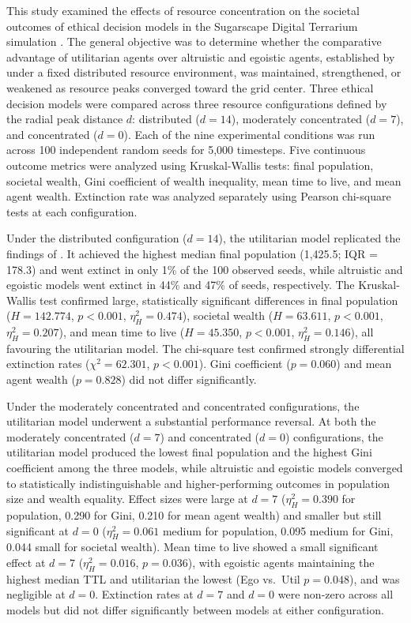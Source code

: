 \documentclass{icsthesis}
\begin{document}
\begin{mainmatter}
This study examined the effects of resource concentration on the societal outcomes of ethical decision models in the Sugarscape Digital Terrarium simulation \citep{KremerHerman2024}. The general objective was to determine whether the comparative advantage of utilitarian agents over altruistic and egoistic agents, established by \citet{KremerHerman2024} under a fixed distributed resource environment, was maintained, strengthened, or weakened as resource peaks converged toward the grid center. Three ethical decision models were compared across three resource configurations defined by the radial peak distance $d$: distributed ($d = 14$), moderately concentrated ($d = 7$), and concentrated ($d = 0$). Each of the nine experimental conditions was run across 100 independent random seeds for 5,000 timesteps. Five continuous outcome metrics were analyzed using Kruskal-Wallis tests: final population, societal wealth, Gini coefficient of wealth inequality, mean time to live, and mean agent wealth. Extinction rate was analyzed separately using Pearson chi-square tests at each configuration.

Under the distributed configuration ($d = 14$), the utilitarian model replicated the findings of \citet{KremerHerman2024}. It achieved the highest median final population (1,425.5; IQR = 178.3) and went extinct in only 1\% of the 100 observed seeds, while altruistic and egoistic models went extinct in 44\% and 47\% of seeds, respectively. The Kruskal-Wallis test confirmed large, statistically significant differences in final population ($H = 142.774$, $p < 0.001$, $\eta^2_H = 0.474$), societal wealth ($H = 63.611$, $p < 0.001$, $\eta^2_H = 0.207$), and mean time to live ($H = 45.350$, $p < 0.001$, $\eta^2_H = 0.146$), all favouring the utilitarian model. The chi-square test confirmed strongly differential extinction rates ($\chi^2 = 62.301$, $p < 0.001$). Gini coefficient ($p = 0.060$) and mean agent wealth ($p = 0.828$) did not differ significantly.

Under the moderately concentrated and concentrated configurations, the utilitarian model underwent a substantial performance reversal. At both the moderately concentrated ($d = 7$) and concentrated ($d = 0$) configurations, the utilitarian model produced the lowest final population and the highest Gini coefficient among the three models, while altruistic and egoistic models converged to statistically indistinguishable and higher-performing outcomes in population size and wealth equality. Effect sizes were large at $d = 7$ ($\eta^2_H = 0.390$ for population, 0.290 for Gini, 0.210 for mean agent wealth) and smaller but still significant at $d = 0$ ($\eta^2_H = 0.061$ medium for population, 0.095 medium for Gini, 0.044 small for societal wealth). Mean time to live showed a small significant effect at $d = 7$ ($\eta^2_H = 0.016$, $p = 0.036$), with egoistic agents maintaining the highest median TTL and utilitarian the lowest (Ego vs.\ Util $p = 0.048$), and was negligible at $d = 0$. Extinction rates at $d = 7$ and $d = 0$ were non-zero across all models but did not differ significantly between models at either configuration.


\end{mainmatter}
\end{document}
